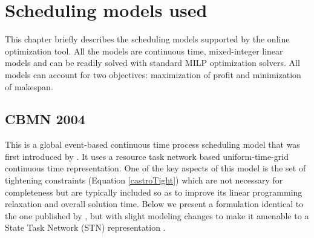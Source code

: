 \chapter{Scheduling models used}
\thispagestyle{plain}
\label{chap:models}
This chapter briefly describes the scheduling models supported by the online optimization tool. All the models are continuous time, mixed-integer linear models and can be readily solved with standard MILP optimization solvers. All models can account for two objectives: maximization of profit and minimization of makespan.

\section{CBMN 2004}
This is a global event-based continuous time process scheduling model that was first introduced by \cite{Castro}. It uses a resource task network based uniform-time-grid continuous time representation. One of the key aspects of this model is the set of tightening constraints (Equation \ref{castroTight}) which are not necessary for completeness but are typically included so as to improve its linear programming relaxation and overall solution time. Below we present a formulation identical to the one published by \cite{Castro}, but with slight modeling changes to make it amenable to a State Task Network (STN) representation \citep{lappas}. 


